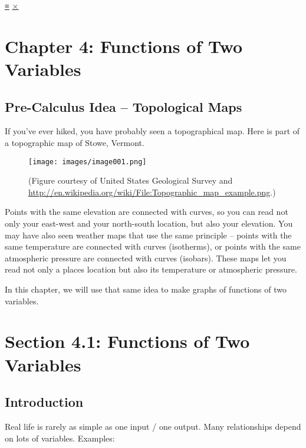 \protect\hyperlink{main-nav}{≡} \protect\hyperlink{close-nav}{×}

\hypertarget{chapter-4-functions-of-two-variables}{%
\section{Chapter 4: Functions of Two
Variables}\label{chapter-4-functions-of-two-variables}}

\hypertarget{pre-calculus-idea-topological-maps}{%
\subsection{Pre-Calculus Idea -- Topological
Maps}\label{pre-calculus-idea-topological-maps}}

If you've ever hiked, you have probably seen a topographical map. Here
is part of a topographic map of Stowe, Vermont.

\begin{figure}
\centering
\texttt{[image: images/image001.png]}
\caption{(Figure courtesy of United States Geological Survey and
\url{http://en.wikipedia.org/wiki/File:Topographic_map_example.png}.)}
\end{figure}

Points with the same elevation are connected with curves, so you can
read not only your east-west and your north-south location, but also
your elevation. You may have also seen weather maps that use the same
principle -- points with the same temperature are connected with curves
(isotherms), or points with the same atmospheric pressure are connected
with curves (isobars). These maps let you read not only a places
location but also its temperature or atmospheric pressure.

In this chapter, we will use that same idea to make graphs of functions
of two variables.

\hypertarget{section-4.1-functions-of-two-variables}{%
\section{Section 4.1: Functions of Two
Variables}\label{section-4.1-functions-of-two-variables}}

\hypertarget{introduction}{%
\subsection{Introduction}\label{introduction}}

Real life is rarely as simple as one input / one output. Many
relationships depend on lots of variables. Examples:

